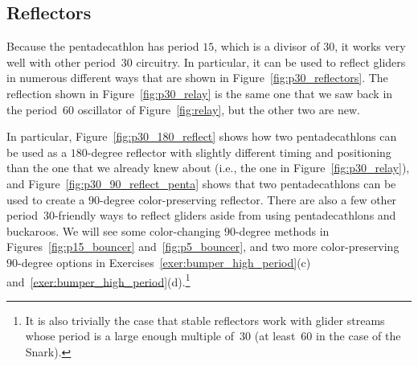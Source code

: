 \subsection{Reflectors}\label{sec:p30_reflectors}

Because the pentadecathlon has period $15$, which is a divisor of $30$, it works very well with other period~$30$ circuitry. In particular, it can be used to reflect gliders in numerous different ways that are shown in Figure~\ref{fig:p30_reflectors}. The reflection shown in Figure~\ref{fig:p30_relay} is the same one that we saw back in the period~$60$ oscillator of Figure~\ref{fig:relay}, but the other two are new.

In particular, Figure~\ref{fig:p30_180_reflect} shows how two pentadecathlons can be used as a $180$-degree reflector with slightly different timing and positioning than the one that we already knew about (i.e., the one in Figure~\ref{fig:p30_relay}), and Figure~\ref{fig:p30_90_reflect_penta} shows that two pentadecathlons can be used to create a $90$-degree color-preserving reflector. There are also a few other period~$30$-friendly ways to reflect gliders aside from using pentadecathlons and buckaroos. We will see some color-changing $90$-degree methods in Figures~\ref{fig:p15_bouncer} and~\ref{fig:p5_bouncer}, and two more color-preserving $90$-degree options in Exercises~\ref{exer:bumper_high_period}(c) and~\ref{exer:bumper_high_period}(d).\footnote{It is also trivially the case that stable reflectors work with glider streams whose period is a large enough multiple of~$30$ (at least~$60$ in the case of the Snark).}

